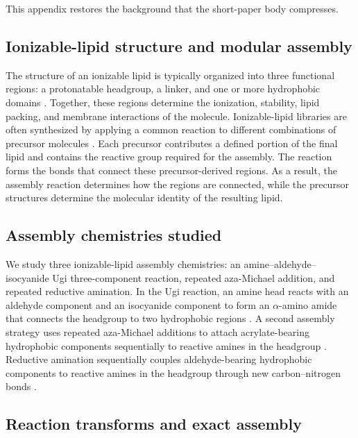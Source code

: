 \documentclass{article}
\begin{document}
This appendix restores the background that the short-paper body compresses.

\subsection{Ionizable-lipid structure and modular assembly}

The structure of an ionizable lipid is typically organized into three functional regions: a
protonatable headgroup, a linker, and one or more hydrophobic domains
\citep{semple2010rational,jayaraman2012maximizing}.
Together, these regions determine the ionization, stability, lipid packing, and membrane
interactions of the molecule.
Ionizable-lipid libraries are often synthesized by applying a common reaction to different
combinations of precursor molecules
\citep{akinc2008combinatorial,love2010lipidlike,li2024accelerating,xu2024agile}.
Each precursor contributes a defined portion of the final lipid and contains the reactive group
required for the assembly.
The reaction forms the bonds that connect these precursor-derived regions.
As a result, the assembly reaction determines how the regions are connected, while the precursor
structures determine the molecular identity of the resulting lipid.

\subsection{Assembly chemistries studied}

We study three ionizable-lipid assembly chemistries: an
amine--aldehyde--isocyanide Ugi three-component reaction, repeated aza-Michael addition, and
repeated reductive amination.
In the Ugi reaction, an amine head reacts with an aldehyde component and an isocyanide
component to form an $\alpha$-amino amide that connects the headgroup to two hydrophobic regions
\citep{xu2024agile}.
A second assembly strategy uses repeated aza-Michael additions to attach acrylate-bearing
hydrophobic components sequentially to reactive amines in the headgroup
\citep{li2023combinatorial}.
Reductive amination sequentially couples aldehyde-bearing hydrophobic components to reactive amines
in the headgroup through new carbon--nitrogen bonds \citep{xue2024barcoding}.

\subsection{Reaction transforms and exact assembly}
\end{document}
